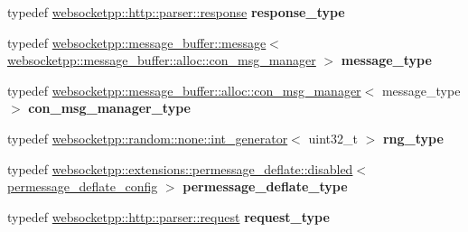 \begin{DoxyCompactItemize}
\item 
\mbox{\label{structstub__config_af1ff5c46d4fc72bce3b5fb9f6090f4d6}} 
typedef \mbox{\hyperlink{classwebsocketpp_1_1http_1_1parser_1_1response}{websocketpp\+::http\+::parser\+::response}} {\bfseries response\+\_\+type}
\item 
\mbox{\label{structstub__config_a251ee9935f06ff126dbdcae6af183493}} 
typedef \mbox{\hyperlink{classwebsocketpp_1_1message__buffer_1_1message}{websocketpp\+::message\+\_\+buffer\+::message}}$<$ \mbox{\hyperlink{classwebsocketpp_1_1message__buffer_1_1alloc_1_1con__msg__manager}{websocketpp\+::message\+\_\+buffer\+::alloc\+::con\+\_\+msg\+\_\+manager}} $>$ {\bfseries message\+\_\+type}
\item 
\mbox{\label{structstub__config_a590413e515623cd51f1cd6c0f72f1018}} 
typedef \mbox{\hyperlink{classwebsocketpp_1_1message__buffer_1_1alloc_1_1con__msg__manager}{websocketpp\+::message\+\_\+buffer\+::alloc\+::con\+\_\+msg\+\_\+manager}}$<$ message\+\_\+type $>$ {\bfseries con\+\_\+msg\+\_\+manager\+\_\+type}
\item 
\mbox{\label{structstub__config_aeea6c7fab96f8cc229d78a822ff9cc5d}} 
typedef \mbox{\hyperlink{classwebsocketpp_1_1random_1_1none_1_1int__generator}{websocketpp\+::random\+::none\+::int\+\_\+generator}}$<$ uint32\+\_\+t $>$ {\bfseries rng\+\_\+type}
\item 
\mbox{\label{structstub__config_a542a8c30b8eec0e129d9487b3a598bdb}} 
typedef \mbox{\hyperlink{classwebsocketpp_1_1extensions_1_1permessage__deflate_1_1disabled}{websocketpp\+::extensions\+::permessage\+\_\+deflate\+::disabled}}$<$ \mbox{\hyperlink{structstub__config_1_1permessage__deflate__config}{permessage\+\_\+deflate\+\_\+config}} $>$ {\bfseries permessage\+\_\+deflate\+\_\+type}
\item 
\mbox{\label{structstub__config_a7d7d444e1d7b2882bf22746be5c25f37}} 
typedef \mbox{\hyperlink{classwebsocketpp_1_1http_1_1parser_1_1request}{websocketpp\+::http\+::parser\+::request}} {\bfseries request\+\_\+type}
\item 
\mbox{\label{structstub__config_af1ff5c46d4fc72bce3b5fb9f6090f4d6}} 

\end{DoxyCompactItemize}
